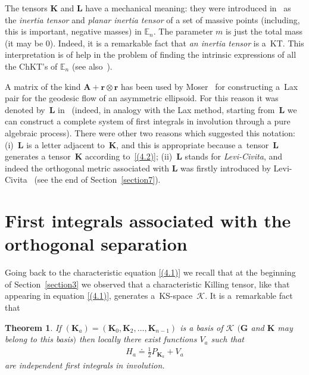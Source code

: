 \documentclass[10pt,a4paper]{amsart}
\def\bs{\boldsymbol}
\numberwithin{equation}{section}
\newtheorem{Theorem}{Theorem}[section]
 { \theoremstyle{definition}
\newtheorem{Notation}[Theorem]{Notation}
\newtheorem{Example}[Theorem]{Example}
\newtheorem{Remark}[Theorem]{Remark}
\newtheorem{Remarks}[Theorem]{Remarks}
 }
\providecommand{\cal}{\mathcal}
\begin{document}
The tensors $\bs K$ and $\bs L$ have a mechanical meaning: they were introduced in~\cite{Benenti-1992b} as the {\it inertia tensor} and {\it planar inertia tensor} of a set of massive points (including, this is important, negative masses) in $\mathbb E_n$. The parameter $m$ is just the total mass (it may be $0$). Indeed, it is a remarkable fact that {\it an inertia tensor} is a~KT. This interpretation is of help in the problem of f\/inding the intrinsic expressions of all the ChKT's of $\mathbb E_n$ (see also~\cite{Marshall-Wojciechowski-1988}).

\begin{Notation}  A matrix of the kind $\bs A+\bs r\otimes\bs r$ has been used by Moser~\cite{Moser-1981} for constructing a~Lax pair for the geodesic f\/low of an asymmetric ellipsoid. For this reason it was denoted by~$\bs L$ in~\cite{Benenti-1992b} (indeed, in analogy with the Lax method, starting from~$\bs L$ we can construct  a complete system of f\/irst integrals in involution through a pure algebraic process). There were other two reasons which suggested this notation: (i)~$\bs L$ is a letter adjacent to~$\bs K$, and this is appropriate because a~tensor~$\bs L$ generates a tensor~$\bs K$ according to~\eqref{(4.2)}; (ii)~$\bs L$ stands for {\it Levi-Civita}, and indeed the orthogonal metric associated with $\bs L$ was f\/irstly introduced by Levi-Civita~\cite{LC-1896} (see the end of Section~\ref{section7}).
\end{Notation}

\section{First integrals associated with the orthogonal separation}\label{section5}

Going back to the characteristic equation \eqref{(4.1)} we recall that at the beginning of Section~\ref{section3} we observed that a characteristic Killing tensor, like that appearing in equation \eqref{(4.1)}, generates a~KS-space~$\cal K$. It is a~remarkable fact that

\begin{Theorem}\label{t:5.1}
If $(\bs K_a)=(\bs K_0, \bs K_2, \ldots, \bs K_{n-1})$ is a basis of $\cal K$  $(\bs G$ and $\bs K$ may belong to this basis$)$ then locally there exist functions $V_a$ such that
\begin{gather}
H_a\doteq \tfrac 12 P_{\bs K_a}+V_a
\label{(5.1)}
\end{gather}
are independent first integrals in involution.
\end{Theorem}
\end{document}
